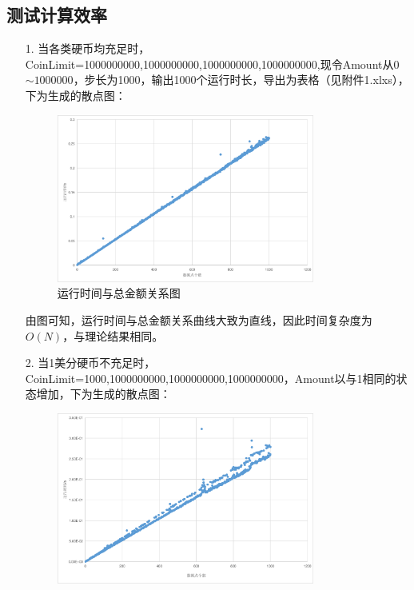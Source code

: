 \documentclass[UTF8]{ctexart}
\begin{document}
\subsection{测试计算效率}
\begin{itemize}
    \item [1.]当各类硬币均充足时，CoinLimit={1000000000,1000000000,1000000000,1000000000},现令Amount从0$\sim 1000000$，步长为1000，输出1000个运行时长，导出为表格（见附件1.xlxs），下为生成的散点图：
                \begin{figure}[H]
                \centering %
                \includegraphics[width=0.8\textwidth]{Fig1.png}
                \caption{运行时间与总金额关系图}
                \label{fig1}
                \end{figure}\par
由图可知，运行时间与总金额关系曲线大致为直线，因此时间复杂度为$O(N)$，与理论结果相同。
    \item [2.]当1美分硬币不充足时，CoinLimit={1000,1000000000,1000000000,1000000000}，Amount以与1相同的状态增加，下为生成的散点图：
                \begin{figure}[H]
                \centering %
                \includegraphics[width=0.8\textwidth]{Fig2.png}

\end{figure}
\end{itemize}
\end{document}
